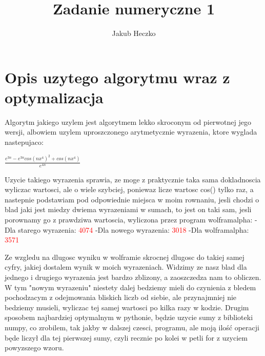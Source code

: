 \documentclass[a4paper,8pt]{article}
\begin{document}
\title{{\Large}Zadanie numeryczne 1}
\date{}
\author{Jakub Heczko}

\maketitle


\section{Opis uzytego algorytmu wraz z optymalizacja}


Algorytm jakiego uzylem jest algorytmem lekko skroconym od pierwotnej jego wersji, albowiem uzylem uproszczonego arytmetycznie wyrazenia, ktore wyglada nastepujaco:

\begin{center}
    $\frac{e^{3n}-e^{3n}cos(nx^4)^2+cos(nx^4)}{e^{4n}}$
\end{center}

Uzycie takiego wyrazenia sprawia, ze moge z praktycznie taka sama dokladnoscia wyliczac wartosci, ale o wiele szybciej, poniewaz licze wartosc cos() tylko raz, a nastepnie podstawiam pod odpowiednie miejsca w moim rownaniu, jesli chodzi o blad jaki jest miedzy dwiema wyrazeniami w sumach, to jest on taki sam, jesli porownamy go z prawdziwa wartoscia, wyliczona przez program wolframalpha:
\newline
\newline
\quad -Dla starego wyrazenia:
\newline
{}\textcolor{red}{4074}
\newline
\newline
\quad -Dla nowego wyrazenia:
\newline
{}\textcolor{red}{3018}
\newline
\newline
\quad -Dla wolframalpha:
\newline
{}\textcolor{red}{3571}
\newline

Ze wzgledu na dlugosc wyniku w wolframie skrocnej dlugosc do takiej samej cyfry, jakiej dostalem wynik w moich wyrazeniach. Widzimy ze nasz blad dla jednego i drugiego wyrazenia jest bardzo zblizony, a zaoszczedza nam to obliczen. W tym "nowym wyrazeniu" niestety dalej bedziemy mieli do czynienia z bledem pochodzacym z odejmowania bliskich liczb od siebie, ale przynajmniej nie bedziemy musieli, wyliczac tej samej wartosci po kilka razy w kodzie. Drugim sposobem najbardziej optymalnym w pythonie, będzie uzycie sumy z biblioteki numpy, co zrobilem, tak jakby w dalszej czesci, programu, ale moją ilość operacji będe liczył dla tej pierwszej sumy, czyli recznie po kolei w petli for z uzyciem powyzszego wzoru.
\end{document}
